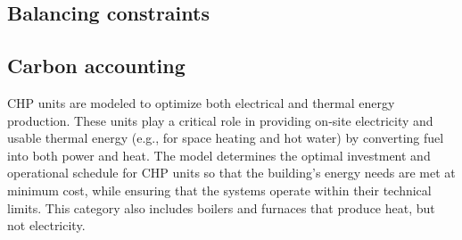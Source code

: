 \documentclass[11pt]{article}
\begin{document}

\subsection{Balancing constraints}

\subsection{Carbon accounting}

CHP units are modeled to optimize both electrical and thermal energy production. These units play a critical role in providing on‐site electricity and usable thermal energy (e.g., for space heating and hot water) by converting fuel into both power and heat. The model determines the optimal investment and operational schedule for CHP units so that the building’s energy needs are met at minimum cost, while ensuring that the systems operate within their technical limits. This category also includes boilers and furnaces that produce heat, but not electricity.
\end{document}
